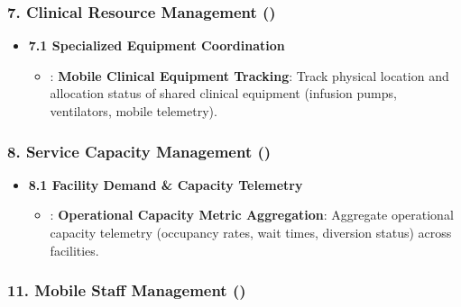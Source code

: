 \subsubsection*{7. Clinical Resource Management (\texttt{})}
\label{rad:enabling:513}

\begin{itemize}

\item
\textbf{7.1 Specialized Equipment Coordination}


\begin{itemize}

\item
\texttt{}: \textbf{Mobile Clinical Equipment Tracking}: Track physical location and allocation status of shared clinical equipment (infusion pumps, ventilators, mobile telemetry).



\end{itemize}


\end{itemize}
\label{rad:enabling:516}
\subsubsection*{8. Service Capacity Management (\texttt{})}
\label{rad:enabling:517}

\begin{itemize}

\item
\textbf{8.1 Facility Demand \& Capacity Telemetry}


\begin{itemize}

\item
\texttt{}: \textbf{Operational Capacity Metric Aggregation}: Aggregate operational capacity telemetry (occupancy rates, wait times, diversion status) across facilities.



\end{itemize}


\end{itemize}
\label{rad:enabling:520}
\subsubsection*{11. Mobile Staff Management (\texttt{})}
\label{rad:enabling:521}

